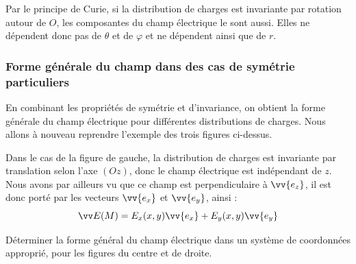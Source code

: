\documentclass[11pt,fleqn]{book} %
\begin{document}
\begin{demonstration}
    Par le principe de Curie, si la distribution de charges est invariante par rotation autour de $O$, les composantes du champ électrique le sont aussi. Elles ne dépendent donc pas de $\theta$ et de $\varphi$ et ne dépendent ainsi que de $r$.
\end{demonstration}

\subsubsection{Forme générale du champ dans des cas de symétrie particuliers} \label{sect:symetries_cas_particuliers}

En combinant les propriétés de symétrie et d'invariance, on obtient la forme générale du champ électrique pour différentes distributions de charges. Nous allons à nouveau reprendre l'exemple des trois figures ci-dessus.

\begin{example}
Dans le cas de la figure de gauche, la distribution de charges est invariante par translation selon l'axe $(Oz)$, donc le champ électrique est indépendant de $z$. Nous avons par ailleurs vu que ce champ est perpendiculaire à $\vv{e_z}$, il est donc porté par les vecteurs $\vv{e_x}$ et $\vv{e_y}$, ainsi :
\begin{equation}
\vv E (M) = E_x(x,y) \vv{e_x} + E_y(x,y) \vv{e_y}
\end{equation}
\end{example}

\begin{capex}
Déterminer la forme général du champ électrique dans un système de coordonnées approprié, pour les figures du centre et de droite.
\end{capex}
\end{document}
